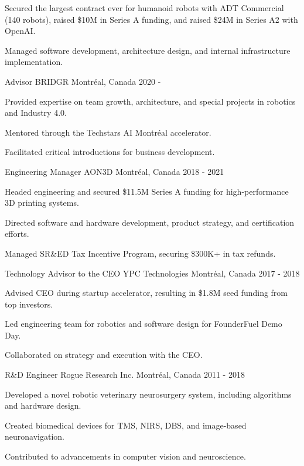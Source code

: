 \documentclass[11pt, letterpaper]{awesome-cv}
\begin{document}
\begin{cventries}
{\begin{cvitems}
            \item{Secured the largest contract ever for humanoid robots with ADT Commercial (140 robots), raised \$10M in Series A funding, and raised \$24M in Series A2 with OpenAI.}
            \item{Managed software development, architecture design, and internal infrastructure implementation.}
        \end{cvitems}
    }
    \cventry
    {Advisor}
    {BRIDGR}
    {Montréal, Canada}
    {2020 - }
    {
        \begin{cvitems}
            \item{Provided expertise on team growth, architecture, and special projects in robotics and Industry 4.0.}
            \item{Mentored through the Techstars AI Montréal accelerator.}
            \item{Facilitated critical introductions for business development.}
        \end{cvitems}
    }
    \cventry
    {Engineering Manager}
    {AON3D}
    {Montréal, Canada}
    {2018 - 2021}
    {
        \begin{cvitems}
            \item{Headed engineering and secured \$11.5M Series A funding for high-performance 3D printing systems.}
            \item{Directed software and hardware development, product strategy, and certification efforts.}
            \item{Managed SR\&ED Tax Incentive Program, securing \$300K+ in tax refunds.}
        \end{cvitems}
    }
    \cventry
    {Technology Advisor to the CEO}
    {YPC Technologies}
    {Montréal, Canada}
    {2017 - 2018}
    {
        \begin{cvitems}
            \item{Advised CEO during startup accelerator, resulting in \$1.8M seed funding from top investors.}
            \item{Led engineering team for robotics and software design for FounderFuel Demo Day.}
            \item{Collaborated on strategy and execution with the CEO.}
        \end{cvitems}
    }
    \cventry
    {R\&D Engineer}
    {Rogue Research Inc.}
    {Montréal, Canada}
    {2011 - 2018}
    {
        \begin{cvitems}
            \item{Developed a novel robotic veterinary neurosurgery system, including algorithms and hardware design.}
            \item{Created biomedical devices for TMS, NIRS, DBS, and image-based neuronavigation.}
            \item{Contributed to advancements in computer vision and neuroscience.}
        \end{cvitems}
    }
\end{cventries}
\end{document}
